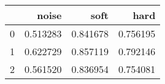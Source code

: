 \begin{tabular}{lrrr}
\toprule
{} &     noise &      soft &      hard \\
\midrule
0 &  0.513283 &  0.841678 &  0.756195 \\
1 &  0.622729 &  0.857119 &  0.792146 \\
2 &  0.561520 &  0.836954 &  0.754081 \\
\bottomrule
\end{tabular}
